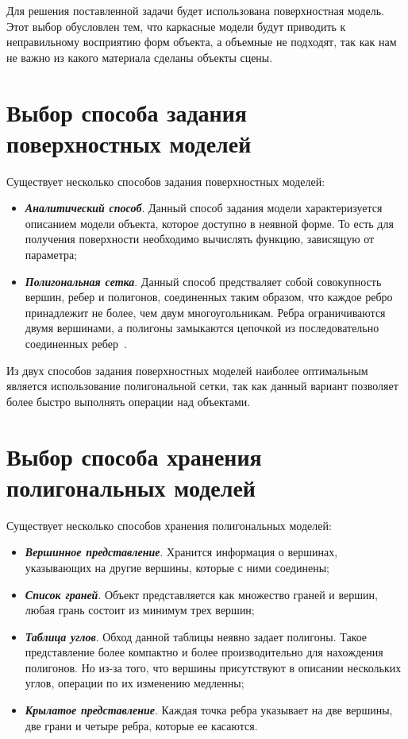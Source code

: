 Для решения поставленной задачи будет использована поверхностная модель. Этот выбор
обусловлен тем, что каркасные модели будут приводить к неправильному восприятию форм объекта,
а объемные не подходят, так как нам не важно из какого материала сделаны объекты сцены.

\section{Выбор способа задания поверхностных моделей}

Существует несколько способов задания поверхностных моделей:
\begin{itemize}
    \item \textit{\textbf{Аналитический способ}}. Данный способ задания модели характеризуется описанием модели
    объекта, которое доступно в неявной форме. То есть для получения поверхности необходимо
    вычислять функцию, зависящую от параметра;
    \item \textit{\textbf{Полигональная сетка}}. Данный способ предстваляет собой совокупность вершин, ребер и полигонов, 
    соединенных таким образом, что каждое ребро принадлежит не более, чем двум многоугольникам. Ребра ограничиваются двумя
    вершинами, а полигоны замыкаются цепочкой из последовательно соединенных ребер~\cite{mgtu}.
\end{itemize}

Из двух способов задания поверхностных моделей наиболее оптимальным является
использование полигональной сетки, так как данный вариант позволяет более быстро выполнять
операции над объектами.

\section{Выбор способа хранения полигональных моделей}

Существует несколько способов хранения полигональных моделей:
\begin{itemize}
    \item \textit{\textbf{Вершинное представление}}. Хранится информация о вершинах, указывающих на другие
    вершины, которые с ними соединены;
    \item \textit{\textbf{Список граней}}. Объект представляется как множество граней и вершин, любая грань состоит
    из минимум трех вершин;
    \item \textit{\textbf{Таблица углов}}. Обход данной таблицы неявно задает полигоны. Такое представление более
    компактно и более производительно для нахождения полигонов. Но из-за того, что вершины
    присутствуют в описании нескольких углов, операции по их изменению медленны;
    \item \textit{\textbf{Крылатое представление}}. Каждая точка ребра указывает на две вершины, 
    две грани и четыре ребра, которые ее касаются.
\end{itemize}

